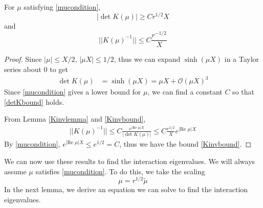 \documentclass[thesis.tex]{subfiles}
\begin{document}
\begin{lemma}\label{Kinvboundslemma}
For $\mu$ satisfying \cref{mucondition},
\begin{equation}\label{detKbound}
|\det K(\mu)| \geq C r^{1/2}X
\end{equation}
and 
\begin{equation}\label{Kinvbound}
||K(\mu)^{-1}|| \leq C \frac{r^{-1/2}}{X}
\end{equation}
\begin{proof}
Since $|\mu| \leq X/2$, $|\mu X| \leq 1/2$, thus we can expand $\sinh(\mu X)$ in a Taylor series about $0$ to get
\begin{align*}
\det K(\mu) &= \sinh(\mu X) = \mu X + \mathcal{O}(\mu X)^3
\end{align*}
Since \cref{mucondition} gives a lower bound for $\mu$, we can find a constant $C$ so that \cref{detKbound} holds. 

From Lemma \ref{Kinvlemma} and \cref{Kinvbound},
\begin{align*}
||K(\mu)^{-1}|| \leq C \frac{e^{|\text{Re }\mu|X }}{| \det K(\mu) |} \leq C \frac{r^{1/2}}{X} e^{|\text{Re }\mu|X }
\end{align*}
By \cref{mucondition}, $e^{|\text{Re }\mu|X } \leq e^{1/2} = C$, thus we have the bound \cref{Kinvbound}.
\end{proof}
\end{lemma}

We can now use these results to find the interaction eigenvalues. We will always assume $\mu$ satisfies \cref{mucondition}. To do this, we take the scaling
\[
\mu = r^{1/2}\tilde{\mu}
\]
In the next lemma, we derive an equation we can solve to find the interaction eigenvalues.
\end{document}
